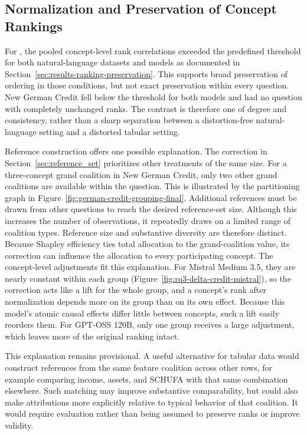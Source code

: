 \subsection{Normalization and Preservation of Concept Rankings}
\label{sec:normalization_and_rankings}

For , the pooled concept-level rank correlations exceeded the predefined threshold for both natural-language datasets and models as documented in Section~\ref{sec:results-ranking-preservation}. This supports broad preservation of ordering in those conditions, but not exact preservation within every question. New German Credit fell below the threshold for both models and had no question with completely unchanged ranks. The contrast is therefore one of degree and consistency, rather than a sharp separation between a distortion-free natural-language setting and a distorted tabular setting.

Reference construction offers one possible explanation. The correction in Section~\ref{sec:reference_set} prioritizes other treatments of the same size. For a three-concept grand coalition in New German Credit, only two other grand coalitions are available within the question. This is illustrated by the partitioning graph in Figure~\ref{fig:german-credit-grouping-final}. Additional references must be drawn from other questions to reach the desired reference-set size. Although this increases the number of observations, it repeatedly draws on a limited range of coalition types. Reference size and substantive diversity are therefore distinct. Because Shapley efficiency ties total allocation to the grand-coalition value, its correction can influence the allocation to every participating concept. The concept-level adjustments fit this explanation. For Mistral Medium 3.5, they are nearly constant within each group (Figure~\ref{fig:rq3-delta-credit-mistral}), so the correction acts like a lift for the whole group, and a concept's rank after normalization depends more on its group than on its own effect. Because this model's atomic causal effects differ little between concepts, such a lift easily reorders them. For GPT-OSS 120B, only one group receives a large adjustment, which leaves more of the original ranking intact.

This explanation remains provisional. A useful alternative for tabular data would construct references from the same feature coalition across other rows, for example comparing income, assets, and SCHUFA with that same combination elsewhere. Such matching may improve substantive comparability, but could also make attributions more explicitly relative to typical behavior of that coalition. It would require evaluation rather than being assumed to preserve ranks or improve validity.

